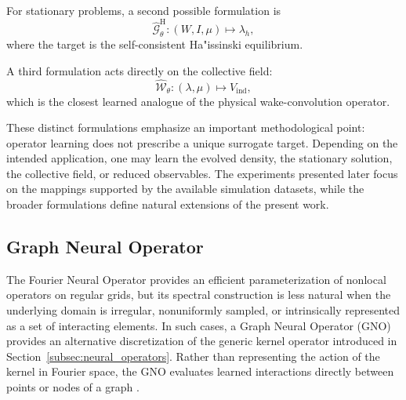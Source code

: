 \documentclass[11pt,a4paper]{article}
\begin{document}
\begin{sloppypar}
For stationary problems, a second possible formulation is
\begin{equation}
\widehat{\mathcal{G}}_{\theta}^{\mathrm{H}}
:
(W,I,\mu)
\longmapsto
\lambda_h,
\label{eq:fno_haissinski_task}
\end{equation}
where the target is the self-consistent Ha"issinski equilibrium.

A third formulation acts directly on the collective field:
\begin{equation}
\widehat{\mathcal{W}}_{\theta}
:
(\lambda,\mu)
\longmapsto
V_{\mathrm{ind}},
\label{eq:fno_voltage_task}
\end{equation}
which is the closest learned analogue of the physical wake-convolution operator.

These distinct formulations emphasize an important methodological point: operator learning does not prescribe a unique surrogate target. Depending on the intended application, one may learn the evolved density, the stationary solution, the collective field, or reduced observables. The experiments presented later focus on the mappings supported by the available simulation datasets, while the broader formulations define natural extensions of the present work.

\subsection{Graph Neural Operator}
\label{subsec:graph_neural_operator}

The Fourier Neural Operator provides an efficient parameterization of nonlocal operators on regular grids, but its spectral construction is less natural when the underlying domain is irregular, nonuniformly sampled, or intrinsically represented as a set of interacting elements. In such cases, a Graph Neural Operator (GNO) provides an alternative discretization of the generic kernel operator introduced in Section~\ref{subsec:neural_operators}. Rather than representing the action of the kernel in Fourier space, the GNO evaluates learned interactions directly between points or nodes of a graph \cite{kovachki_neural_2023}.


\end{sloppypar}
\end{document}
